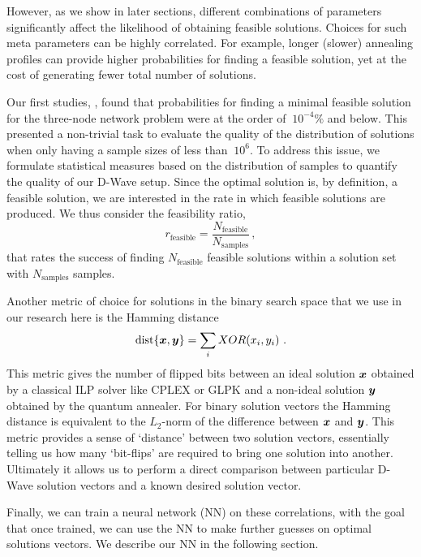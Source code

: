 \documentclass[utf8, nocrop]{FrontiersinHarvardArxiv}
\def\ve#1{\mathlette{\boldmath}{#1}}
\def\mathlette#1#2{{\mathchoice{\mbox{#1$\displaystyle #2$}}%
        {\mbox{#1$\textstyle #2$}}%
        {\mbox{#1$\scriptstyle #2$}}%
        {\mbox{#1$\scriptscriptstyle #2$}}}}
\begin{document}
However, as we show in later sections, different combinations of parameters significantly affect the likelihood of obtaining feasible solutions.
Choices for such meta parameters can be highly correlated.
For example, longer (slower) annealing profiles can provide higher probabilities for finding a feasible solution, yet at the cost of generating fewer total number of solutions. 

Our first studies, \cite{Witt:2022lsx}, found that probabilities for finding a minimal feasible solution for the three-node network problem were at the order of $~ 10^{-4}\%$ and below.  This presented a non-trivial task to evaluate the quality of the distribution of solutions when only having a sample sizes of less than $~ 10^6$.
To address this issue, we formulate statistical measures based on the distribution of samples to quantify the quality of our D-Wave setup. Since the optimal solution is, by definition, a feasible solution, we are interested in the rate in which feasible solutions are produced.  We thus consider the feasibility ratio,
\def\rfeas{r_\mathrm{feasible}}
\def\Nfeas{N_\mathrm{feasible}}
\def\Nsamp{N_\mathrm{samples}}
\begin{equation}
    \rfeas=\frac{\Nfeas}{\Nsamp}\,,\label{eq:feasi_ratio}
\end{equation}
that rates the success of finding $\Nfeas$ feasible solutions within a solution set with $\Nsamp$ samples.

Another metric of choice for solutions in the binary search space that we use in our research here is the Hamming distance 
\begin{equation}
    \text{dist}\{\ve{x},\ve{y}\} = \sum_i XOR(x_i,y_i)\ .
\end{equation}
This metric gives the number of flipped bits between an ideal solution $\ve{x}$ obtained by a classical ILP solver like CPLEX or GLPK and a non-ideal solution $\ve{y}$ obtained by the quantum annealer. 
For binary solution vectors the Hamming distance is equivalent to the $L_2$-norm of the difference between $\ve{x}$ and $\ve{y}$.
This metric provides a sense of `distance' between two solution vectors, essentially telling us how many `bit-flips' are required to bring one solution into another.
Ultimately it allows us to perform a direct comparison between particular D-Wave solution vectors and a known desired solution vector.  

Finally, we can train a neural network (NN) on these correlations, with the goal that once trained, we can use the NN to make further guesses on optimal solutions vectors.  We describe our NN in the following section.
\end{document}
